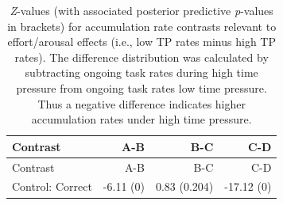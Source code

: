 \documentclass[11pt,]{article}
\begin{document}
\begin{longtable}[]{@{}lrrr@{}}
\caption{\emph{Z}-values (with associated posterior predictive
\emph{p}-values in brackets) for accumulation rate contrasts relevant to
effort/arousal effects (i.e., low TP rates minus high TP rates). The
difference distribution was calculated by subtracting ongoing task rates
during high time pressure from ongoing task rates low time pressure.
Thus a negative difference indicates higher accumulation rates under
high time pressure.}\tabularnewline
\toprule
\begin{minipage}[b]{0.21\columnwidth}\raggedright\strut
Contrast\strut
\end{minipage} & \begin{minipage}[b]{0.14\columnwidth}\raggedleft\strut
A-B\strut
\end{minipage} & \begin{minipage}[b]{0.16\columnwidth}\raggedleft\strut
B-C\strut
\end{minipage} & \begin{minipage}[b]{0.12\columnwidth}\raggedleft\strut
C-D\strut
\end{minipage}\tabularnewline
\midrule
\endfirsthead
\toprule
\begin{minipage}[b]{0.21\columnwidth}\raggedright\strut
Contrast\strut
\end{minipage} & \begin{minipage}[b]{0.14\columnwidth}\raggedleft\strut
A-B\strut
\end{minipage} & \begin{minipage}[b]{0.16\columnwidth}\raggedleft\strut
B-C\strut
\end{minipage} & \begin{minipage}[b]{0.12\columnwidth}\raggedleft\strut
C-D\strut
\end{minipage}\tabularnewline
\midrule
\endhead
\begin{minipage}[t]{0.21\columnwidth}\raggedright\strut
Control: Correct\strut
\end{minipage} & \begin{minipage}[t]{0.14\columnwidth}\raggedleft\strut
-6.11 (0)\strut
\end{minipage} & \begin{minipage}[t]{0.16\columnwidth}\raggedleft\strut
0.83 (0.204)\strut
\end{minipage} & \begin{minipage}[t]{0.12\columnwidth}\raggedleft\strut
-17.12 (0)\strut
\end{minipage}\tabularnewline

\end{longtable}
\end{document}
